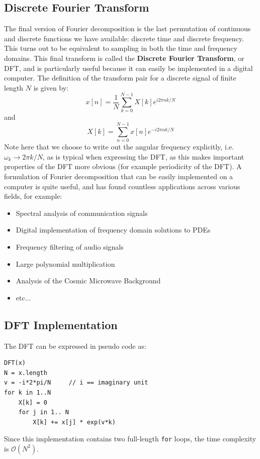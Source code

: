 \subsection{Discrete Fourier Transform}
The final version of Fourier decomposition is the last permutation of continuous and discrete functions we have available: discrete time and discrete frequency. This turns out to be equivalent to sampling in both the time and frequency domains. This final transform is called the \textbf{Discrete Fourier Transform}, or DFT, and is particularly useful because it can easily be implemented in a digital computer. The definition of the transform pair for a discrete signal of finite length $N$ is given by:
\[
x[n] = \dfrac{1}{N}\sum_{k=0}^{N-1}X[k]e^{i2\pi n k /N}
\]
and
\[
X[k] = \sum_{n=0}^{N-1}x[n]e^{-i2\pi n k /N}
\]
Note here that we choose to write out the angular frequency explicitly, i.e. $\omega_k \rightarrow 2\pi k/N$, as is typical when expressing the DFT, as this makes important properties of the DFT more obvious (for example periodicity of the DFT). A formulation of Fourier decomposition that can be easily implemented on a computer is quite useful, and has found countless applications across various fields, for example:
\begin{itemize}
    \item Spectral analysis of communication signals
    \item Digital implementation of frequency domain solutions to PDEs
    \item Frequency filtering of audio signals
    \item Large polynomial multiplication
    \item Analysis of the Cosmic Microwave Background
    \item etc...
\end{itemize}



\subsection{DFT Implementation}
\label{DFT_implementation}
The DFT can be expressed in pseudo code as:
\begin{lstlisting}
DFT(x)
N = x.length
v = -i*2*pi/N     // i == imaginary unit
for k in 1..N
    X[k] = 0
    for j in 1.. N
        X[k] += x[j] * exp(v*k)
\end{lstlisting}
Since this implementation contains two full-length \texttt{for} loops, the time complexity is $\mathcal{O}(N^2)$.


